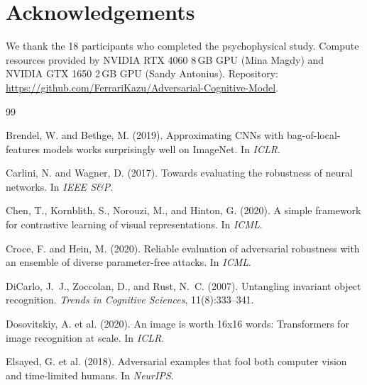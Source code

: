 \documentclass[12pt,a4paper]{article}
\begin{document}
\section*{Acknowledgements}

We thank the 18 participants who completed the psychophysical study.
Compute resources provided by NVIDIA RTX 4060 8\,GB GPU (Mina Magdy)
and NVIDIA GTX 1650 2\,GB GPU (Sandy Antonius).
Repository: \url{https://github.com/FerrariKazu/Adversarial-Cognitive-Model}.


\begin{thebibliography}{99}

Brendel, W. and Bethge, M. (2019).
\newblock Approximating {CNNs} with bag-of-local-features models works
  surprisingly well on {ImageNet}.
\newblock In \emph{ICLR}.

Carlini, N. and Wagner, D. (2017).
\newblock Towards evaluating the robustness of neural networks.
\newblock In \emph{IEEE S\&P}.

Chen, T., Kornblith, S., Norouzi, M., and Hinton, G. (2020).
\newblock A simple framework for contrastive learning of visual representations.
\newblock In \emph{ICML}.

Croce, F. and Hein, M. (2020).
\newblock Reliable evaluation of adversarial robustness with an ensemble
  of diverse parameter-free attacks.
\newblock In \emph{ICML}.

DiCarlo, J.~J., Zoccolan, D., and Rust, N.~C. (2007).
\newblock Untangling invariant object recognition.
\newblock \emph{Trends in Cognitive Sciences}, 11(8):333--341.

Dosovitskiy, A. et al. (2020).
\newblock An image is worth 16x16 words: Transformers for image recognition
  at scale.
\newblock In \emph{ICLR}.

Elsayed, G. et al. (2018).
\newblock Adversarial examples that fool both computer vision and
  time-limited humans.
\newblock In \emph{NeurIPS}.


\end{thebibliography}
\end{document}

